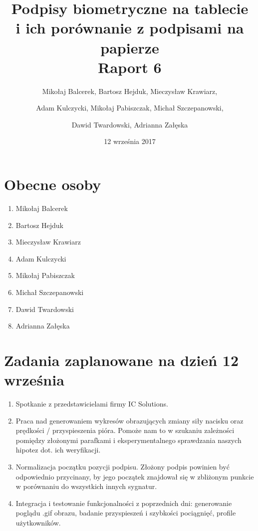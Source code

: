 \documentclass{mwrep}
\title{Podpisy biometryczne na tablecie \\ i ich porównanie z podpisami na papierze\\ 
Raport 6}
\author{Mikołaj Balcerek, Bartosz Hejduk, Mieczysław Krawiarz, \and Adam Kulczycki, Mikołaj Pabiszczak, Michał Szczepanowski, \and Dawid Twardowski, Adrianna Załęska}
\date{12 września 2017}
\begin{document}
\maketitle
{\let\clearpage\relax 
\chapter{Obecne osoby}}
\begin{enumerate}
    \item Mikołaj Balcerek
    \item Bartosz Hejduk
    \item Mieczysław Krawiarz
    \item Adam Kulczycki
    \item Mikołaj Pabiszczak
    \item Michał Szczepanowski
    \item Dawid Twardowski
    \item Adrianna Załęska
\end{enumerate}


{\let\clearpage\relax 
\chapter{Zadania zaplanowane na dzień 12 września}}
\begin{enumerate}
	\item Spotkanie z przedstawicielami firmy IC Solutions.
	\item Praca nad generowaniem wykresów obrazujących zmiany siły nacisku oraz prędkości / przyspieszenia pióra. Pomoże nam to w szukaniu zależności pomiędzy złożonymi parafkami i eksperymentalnego sprawdzania naszych hipotez dot. ich weryfikacji.
	\item Normalizacja początku pozycji podpisu. Złożony podpis powinien być odpowiednio przycinany, by jego początek znajdował się w zbliżonym punkcie w porównaniu do wszystkich innych sygnatur.
	\item Integracja i testowanie funkcjonalności z poprzednich dni: generowanie poglądu .gif obrazu, badanie przyspieszeń i szybkości pociągnięć, profile użytkowników.
\end{enumerate}
\end{document}
